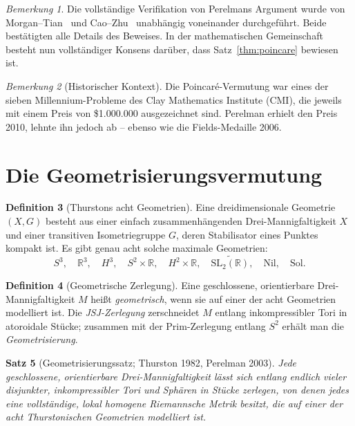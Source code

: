\documentclass[12pt,a4paper]{amsart}
\newtheorem{theorem}{Satz}[section]
\theoremstyle{definition}
\newtheorem{definition}[theorem]{Definition}
\theoremstyle{remark}
\newtheorem{bemerkung}[theorem]{Bemerkung}
\newcommand{\R}{\mathbb{R}}
\begin{document}
\begin{bemerkung}
Die vollständige Verifikation von Perelmans Argument wurde von
Morgan--Tian~\cite{MorganTian2007} und Cao--Zhu~\cite{CaoZhu2006} unabhängig
voneinander durchgeführt.  Beide bestätigten alle Details des Beweises.
In der mathematischen Gemeinschaft besteht nun vollständiger Konsens darüber,
dass Satz~\ref{thm:poincare} bewiesen ist.
\end{bemerkung}

\begin{bemerkung}[Historischer Kontext]
Die Poincaré-Vermutung war eines der sieben Millennium-Probleme des Clay
Mathematics Institute (CMI), die jeweils mit einem Preis von
\$1{.}000{.}000 ausgezeichnet sind.  Perelman erhielt den Preis 2010, lehnte
ihn jedoch ab -- ebenso wie die Fields-Medaille 2006.
\end{bemerkung}


\section{Die Geometrisierungsvermutung}
\label{sec:geom}

\begin{definition}[Thurstons acht Geometrien]
\label{def:geom}
Eine dreidimensionale Geometrie $(X,G)$ besteht aus einer einfach
zusammenhängenden Drei-Mannigfaltigkeit $X$ und einer transitiven
Isometriegruppe $G$, deren Stabilisator eines Punktes kompakt ist.
Es gibt genau acht solche maximale Geometrien:
\[
  S^3,\quad \R^3,\quad H^3,\quad S^2\times\R,\quad H^2\times\R,\quad
  \widetilde{\mathrm{SL}_2(\R)},\quad \mathrm{Nil},\quad \mathrm{Sol}.
\]
\end{definition}

\begin{definition}[Geometrische Zerlegung]
Eine geschlossene, orientierbare Drei-Mannigfaltigkeit $M$ heißt
\emph{geometrisch}, wenn sie auf einer der acht Geometrien modelliert ist.
Die \emph{JSJ-Zerlegung} zerschneidet $M$ entlang inkompressibler Tori in
atoroidale Stücke; zusammen mit der Prim-Zerlegung entlang $S^2$ erhält man
die \emph{Geometrisierung}.
\end{definition}

\begin{theorem}[Geometrisierungssatz; Thurston 1982, Perelman 2003]
\label{thm:geom}
Jede geschlossene, orientierbare Drei-Mannigfaltigkeit lässt sich entlang
endlich vieler disjunkter, inkompressibler Tori und Sphären in Stücke
zerlegen, von denen jedes eine vollständige, lokal homogene Riemannsche
Metrik besitzt, die auf einer der acht Thurstonischen Geometrien modelliert
ist.
\end{theorem}
\end{document}
